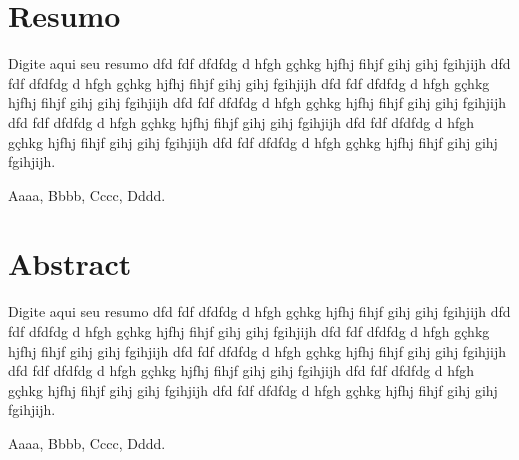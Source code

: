 \documentclass[12pt, a4paper, oneside]{book}
\begin{document}
\chapter*{Resumo}
\noindent
Digite aqui seu resumo dfd fdf dfdfdg d hfgh gçhkg hjfhj fihjf gihj gihj fgihjijh dfd fdf dfdfdg d hfgh gçhkg hjfhj fihjf gihj gihj fgihjijh dfd fdf dfdfdg d hfgh gçhkg hjfhj fihjf gihj gihj fgihjijh dfd fdf dfdfdg d hfgh gçhkg hjfhj fihjf gihj gihj fgihjijh dfd fdf dfdfdg d hfgh gçhkg hjfhj fihjf gihj gihj fgihjijh dfd fdf dfdfdg d hfgh gçhkg hjfhj fihjf gihj gihj fgihjijh dfd fdf dfdfdg d hfgh gçhkg hjfhj fihjf gihj gihj fgihjijh.
 
 Aaaa, Bbbb, Cccc, Dddd.


\newpage
\thispagestyle{empty}
\chapter*{Abstract}
\noindent
Digite aqui seu resumo dfd fdf dfdfdg d hfgh gçhkg hjfhj fihjf gihj gihj fgihjijh dfd fdf dfdfdg d hfgh gçhkg hjfhj fihjf gihj gihj fgihjijh dfd fdf dfdfdg d hfgh gçhkg hjfhj fihjf gihj gihj fgihjijh dfd fdf dfdfdg d hfgh gçhkg hjfhj fihjf gihj gihj fgihjijh dfd fdf dfdfdg d hfgh gçhkg hjfhj fihjf gihj gihj fgihjijh dfd fdf dfdfdg d hfgh gçhkg hjfhj fihjf gihj gihj fgihjijh dfd fdf dfdfdg d hfgh gçhkg hjfhj fihjf gihj gihj fgihjijh.

 Aaaa, Bbbb, Cccc, Dddd.


\newpage
\thispagestyle{empty}
\tableofcontents


\newpage
\listoffigures


\newpage
\listoftables

\mainmatter








\end{document}
